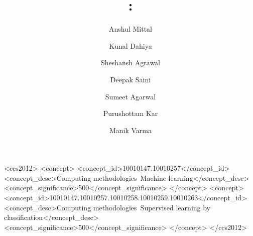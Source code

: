 \title{\alg: \algfull}

\author{Anshul Mittal}
\author{Kunal Dahiya}
\author{Sheshansh Agrawal}
\author{Deepak Saini}
\author{Sumeet Agarwal}
\author{Purushottam Kar}
\author{Manik Varma}


\renewcommand{\shortauthors}{Mittal and Dahiya, et al.}



\begin{CCSXML}
<ccs2012>
<concept>
<concept_id>10010147.10010257</concept_id>
<concept_desc>Computing methodologies~Machine learning</concept_desc>
<concept_significance>500</concept_significance>
</concept>
<concept>
<concept_id>10010147.10010257.10010258.10010259.10010263</concept_id>
<concept_desc>Computing methodologies~Supervised learning by classification</concept_desc>
<concept_significance>500</concept_significance>
</concept>
</ccs2012>
\end{CCSXML}



\maketitle
